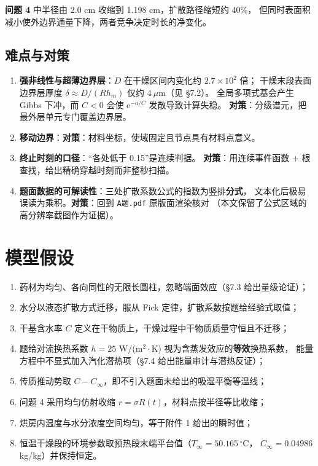 \documentclass[12pt,a4paper]{ctexart}
\newcommand{\ee}{\mathrm{e}}
\begin{document}
\textbf{问题 4} 中半径由 2.0 cm 收缩到 1.198 cm，扩散路径缩短约 40\%，
但同时表面积减小使外边界通量下降，两者竞争决定时长的净变化。

\subsection{难点与对策}

\begin{enumerate}[label=\arabic*),leftmargin=1.8em,itemsep=1pt]
  \item \textbf{强非线性与超薄边界层}：$D$ 在干燥区间内变化约 $2.7\times10^2$ 倍；
        干燥末段表面边界层厚度 $\delta\approx D/(Rh_m)$ 仅约 $4\ \mu$m（见 \S7.2）。
        全局多项式基会产生 Gibbs 下冲，而 $C<0$ 会使 $\ee^{-a/C}$ 发散导致计算失稳。
        \textbf{对策}：分级谱元，把最外层单元专门覆盖边界层。
  \item \textbf{移动边界}：\textbf{对策}：材料坐标，使域固定且节点具有材料点意义。
  \item \textbf{终止时刻的口径}：“各处低于 0.15”是连续判据。
        \textbf{对策}：用连续事件函数 + 根查找，给出精确穿越时刻而非整秒扫描。
  \item \textbf{题面数据的可解读性}：三处扩散系数公式的指数为竖排\textbf{分式}，
        文本化后极易误读为乘积。\textbf{对策}：回到 \texttt{A题.pdf} 原版面渲染核对
        （本文保留了公式区域的高分辨率截图作为证据）。
\end{enumerate}

\section{模型假设}

\begin{enumerate}[label=\arabic*.,leftmargin=2.0em,itemsep=1pt]
  \item 药材为均匀、各向同性的无限长圆柱，忽略端面效应（\S7.3 给出量级论证）；
  \item 水分以液态扩散方式迁移，服从 Fick 定律，扩散系数按题给经验式取值；
  \item 干基含水率 $C$ 定义在干物质上，干燥过程中干物质质量守恒且不迁移；
  \item 题给对流换热系数 $h=25$ W/(m$^2\cdot$K) 视为含蒸发效应的\textbf{等效}换热系数，
        能量方程中不显式加入汽化潜热项（\S7.4 给出能量审计与潜热反证）；
  \item 传质推动势取 $C-C_\infty$，即不引入题面未给出的吸湿平衡等温线；
  \item 问题 4 采用均匀仿射收缩 $r=\sigma R(t)$，材料点按半径等比收缩；
  \item 烘房内温度与水分浓度空间均匀，等于附件 1 给出的瞬时值；
  \item 恒温干燥段的环境参数取预热段末端平台值（$T_\infty=50.165\,^\circ$C，
        $C_\infty=0.04986$ kg/kg）并保持恒定。
\end{enumerate}
\end{document}

